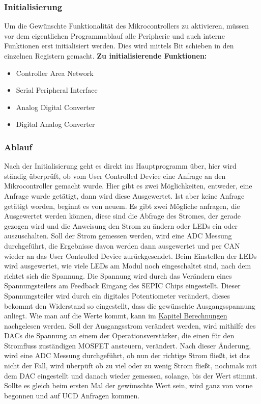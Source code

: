 \documentclass[paper=a4, 12pt]{scrreprt}
\begin{document}
		\subsubsection{Initialisierung}\hfill \break
		Um die Gewünschte Funktionalität des Mikrocontrollers zu aktivieren, müssen vor dem eigentlichen Programmablauf alle Peripherie und auch interne Funktionen erst initialisiert werden. Dies wird mittels Bit schieben in den einzelnen Registern gemacht. \hfill \break \hfill \break		
		\textbf{Zu initialisierende Funktionen:}
		\begin{itemize}
			\item Controller Area Network
			\item Serial Peripheral Interface
			\item Analog Digital Converter
			\item Digital Analog Converter
		\end{itemize}
	
		\subsubsection{Ablauf}\hfill \break
		Nach der Initialisierung geht es direkt ins Hauptprogramm über, hier wird ständig überprüft, ob vom User Controlled Device eine Anfrage an den Mikrocontroller gemacht wurde. Hier gibt es zwei Möglichkeiten, entweder, eine Anfrage wurde getätigt, dann wird diese Ausgewertet. Ist aber keine Anfrage getätigt worden, beginnt es von neuem.\hfill \break \hfill \break
		Es gibt zwei Mögliche anfragen, die Ausgewertet werden können, diese sind die Abfrage des Stromes, der gerade gezogen wird und die Anweisung den Strom zu ändern oder LEDs ein oder auszuschalten.\hfill \break \hfill \break
		Soll der Strom gemessen werden, wird eine ADC Messung durchgeführt, die Ergebnisse davon werden dann ausgewertet und per CAN wieder an das User Controlled Device zurückgesendet.\hfill \break \hfill \break
		Beim Einstellen der LEDs wird ausgewertet, wie viele LEDs am Modul noch eingeschaltet sind, nach dem richtet sich die Spannung. Die Spannung wird durch das Verändern eines Spannungsteilers am Feedback Eingang des SEPIC Chips eingestellt. Dieser Spannungsteiler wird durch ein digitales Potentiometer verändert, dieses bekommt den Widerstand so eingestellt, dass die gewünschte Ausgangsspannung anliegt. Wie man auf die Werte kommt, kann im \hyperref[sec:berechnungen]{Kapitel Berechnungen} nachgelesen werden.\hfill \break \hfill \break
		Soll der Ausgangsstrom verändert werden, wird mithilfe des DACs die Spannung an einem der Operationsverstärker, die einen für den Stromfluss zuständigen MOSFET ansteuern, verändert. Nach dieser Änderung, wird eine ADC Messung durchgeführt, ob nun der richtige Strom fließt, ist das nicht der Fall, wird überpüft ob zu viel oder zu wenig Strom fließt, nochmals mit dem DAC eingestellt und danach wieder gemessen, solange, bis der Wert stimmt. Sollte es gleich beim ersten Mal der gewünschte Wert sein, wird ganz von vorne begonnen und auf UCD Anfragen kommen.
		\newpage
		
\end{document}

